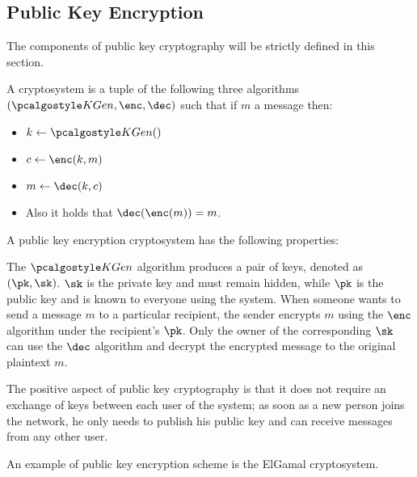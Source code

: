\subsection{Public Key Encryption}

The components of public key cryptography will be strictly defined in this section. 

A cryptosystem is a tuple of the following three algorithms $(\kgen, \enc, \dec)$ such that if $m$ a message then:
\begin{itemize}
    \item $k \gets \kgen()$
    \item $c \gets \enc(k,m)$
    \item $m \gets \dec(k,c)$
    \item Also it holds that $\dec(\enc(m)) = m$.
\end{itemize}

A public key encryption cryptosystem has the following properties:

The $\kgen$ algorithm produces a pair of keys, denoted as $(\pk, \sk)$. $\sk$ is the private key and must remain hidden, while $\pk$ is the public key and is known to everyone using the system. 
When someone wants to send a message $m$ to a particular recipient, the sender encrypts $m$ using the $\enc$ algorithm under the recipient's $\pk$. Only the owner of the corresponding $\sk$ can use the $\dec$ algorithm and decrypt the encrypted message to the original plaintext $m$.

The positive aspect of public key cryptography is that it does not require an exchange of keys between each user of the system; as soon as a new person joins the network, he only needs to publish his public key and can receive messages from any other user.

An example of public key encryption scheme is the ElGamal cryptosystem.

% 
